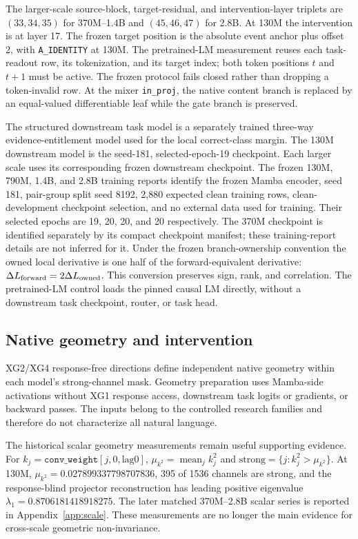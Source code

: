 The larger-scale source-block, target-residual, and intervention-layer
triplets are $(33,34,35)$ for 370M--1.4B and $(45,46,47)$ for 2.8B.
At 130M the intervention is at layer 17. The frozen target position is
the absolute event anchor plus offset 2, with \texttt{A\_IDENTITY} at
130M. The pretrained-LM measurement reuses each task-readout row, its
tokenization, and its target index; both token positions $t$ and $t+1$
must be active. The frozen protocol fails closed rather than dropping
a token-invalid row. At the mixer \texttt{in\_proj}, the native content
branch is replaced by an equal-valued differentiable leaf while the gate
branch is preserved.

The structured downstream task model is a separately trained three-way
evidence-entitlement model used for the local correct-class margin. The
130M downstream model is the seed-181, selected-epoch-19 checkpoint.
Each larger scale uses its corresponding frozen downstream checkpoint.
The frozen 130M, 790M, 1.4B, and 2.8B training reports identify the
frozen Mamba encoder, seed 181,
pair-group split seed 8192, 2,880 expected clean training rows,
clean-development checkpoint selection, and no external data used for
training. Their selected epochs are 19, 20, 20, and 20 respectively.
The 370M checkpoint is identified separately by its compact checkpoint
manifest; these training-report details are not inferred for it.
Under the frozen branch-ownership convention the owned local derivative is
one half of the forward-equivalent derivative:
$\Delta L_{\rm forward}=2\Delta L_{\rm owned}$.
This conversion preserves sign, rank, and correlation. The pretrained-LM
control loads the pinned causal LM directly, without a downstream task
checkpoint, router, or task head.

\subsection{Native geometry and intervention}
\label{app:geometry}

XG2/XG4 response-free directions define independent native geometry within each model's strong-channel mask. Geometry preparation uses Mamba-side activations without XG1 response access, downstream task logits or gradients, or backward passes. The inputs belong to the controlled research families and therefore do not characterize all natural language.

The historical scalar geometry measurements remain useful supporting evidence. For
$k_j=\texttt{conv\_weight}[j,0,\mathrm{lag0}]$,
$\mu_{k^2}=\operatorname{mean}_j k_j^2$ and
$\mathrm{strong}=\{j:k_j^2>\mu_{k^2}\}$.
At 130M, $\mu_{k^2}=0.027899337798707836$, 395 of 1536 channels are strong, and the response-blind projector reconstruction has leading positive eigenvalue
$\lambda_1=0.8706181418918275$. The later matched 370M--2.8B scalar series is reported in Appendix~\ref{app:scale}. These measurements are no longer the main evidence for cross-scale geometric non-invariance.

